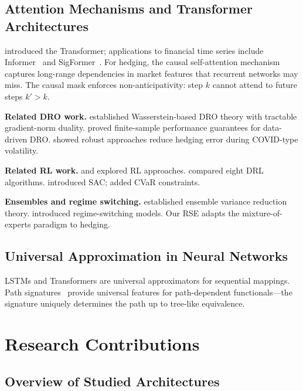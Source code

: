 \subsection{Attention Mechanisms and Transformer Architectures}

\citet{vaswani2017attention} introduced the Transformer; applications to financial time series include Informer~\citep{zhou2021informer} and SigFormer~\citep{tong2023sigformer}. For hedging, the causal self-attention mechanism captures long-range dependencies in market features that recurrent networks may miss. The causal mask enforces non-anticipativity: step $k$ cannot attend to future steps $k'>k$.

\textbf{Related DRO work.} \citet{blanchet2019quantifying} established Wasserstein-based DRO theory with tractable gradient-norm duality. \citet{esfahani2018data} proved finite-sample performance guarantees for data-driven DRO. \citet{lutkebohmert2019robust} showed robust approaches reduce hedging error during COVID-type volatility.

\textbf{Related RL work.} \citet{kolm2019dynamic} and \citet{cao2021deep} explored RL approaches. \citet{neagu2025drl} compared eight DRL algorithms. \citet{haarnoja2018soft} introduced SAC; \citet{huang2025sac} added CVaR constraints.

\textbf{Ensembles and regime switching.} \citet{dietterich2000ensemble} established ensemble variance reduction theory. \citet{hamilton1989new} introduced regime-switching models. Our RSE adapts the mixture-of-experts paradigm to hedging.

\subsection{Universal Approximation in Neural Networks}

LSTMs and Transformers are universal approximators for sequential mappings. Path signatures~\citep{lyons1998differential} provide universal features for path-dependent functionals---the signature uniquely determines the path up to tree-like equivalence.

\section{Research Contributions}
\label{sec:contributions}

\subsection{Overview of Studied Architectures}


